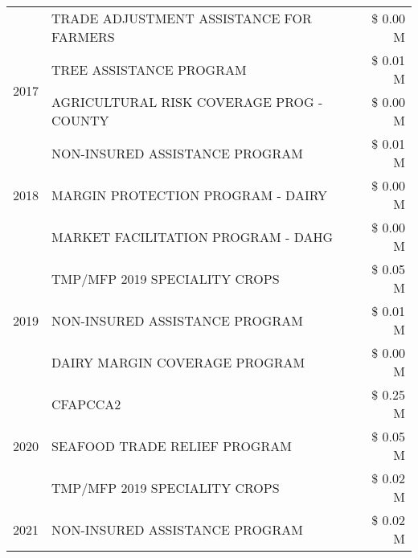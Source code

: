\begin{tabular}{llr}
 & TRADE ADJUSTMENT ASSISTANCE FOR FARMERS & \$ 0.00 M \\
\cline{1-3}
\multirow[t]{2}{*}{2017} & TREE ASSISTANCE PROGRAM & \$ 0.01 M \\
 & AGRICULTURAL RISK COVERAGE PROG - COUNTY & \$ 0.00 M \\
\cline{1-3}
\multirow[t]{3}{*}{2018} & NON-INSURED ASSISTANCE PROGRAM & \$ 0.01 M \\
 & MARGIN PROTECTION PROGRAM - DAIRY & \$ 0.00 M \\
 & MARKET FACILITATION PROGRAM - DAHG & \$ 0.00 M \\
\cline{1-3}
\multirow[t]{3}{*}{2019} & TMP/MFP 2019 SPECIALITY CROPS & \$ 0.05 M \\
 & NON-INSURED ASSISTANCE PROGRAM & \$ 0.01 M \\
 & DAIRY MARGIN COVERAGE PROGRAM & \$ 0.00 M \\
\cline{1-3}
\multirow[t]{3}{*}{2020} & CFAPCCA2 & \$ 0.25 M \\
 & SEAFOOD TRADE RELIEF PROGRAM & \$ 0.05 M \\
 & TMP/MFP 2019 SPECIALITY CROPS & \$ 0.02 M \\
\cline{1-3}
2021 & NON-INSURED ASSISTANCE PROGRAM & \$ 0.02 M \\
\cline{1-3}
\bottomrule
\end{tabular}
